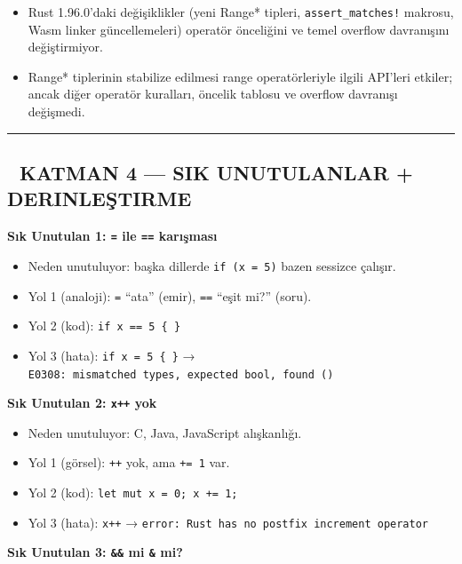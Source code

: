 \documentclass[12pt,a4paper]{article}
\begin{document}
\begin{itemize}
\tightlist
\item
  Rust 1.96.0'daki değişiklikler (yeni Range* tipleri, \texttt{assert\_matches!} makrosu, Wasm linker güncellemeleri) operatör önceliğini ve temel overflow davranışını değiştirmiyor.
\item
  Range* tiplerinin stabilize edilmesi range operatörleriyle ilgili API'leri etkiler; ancak diğer operatör kuralları, öncelik tablosu ve overflow davranışı değişmedi.
\end{itemize}

\begin{center}\rule{0.5\linewidth}{0.5pt}\end{center}

\subsection{🔴 KATMAN 4 --- SIK UNUTULANLAR + DERINLEŞTIRME}\label{katman-4-—-sik-unutulanlar-derinleştirme-4}

\textbf{Sık Unutulan 1: \texttt{=} ile \texttt{==} karışması}

\begin{itemize}
\tightlist
\item
  Neden unutuluyor: başka dillerde \texttt{if\ (x\ =\ 5)} bazen sessizce çalışır.
\item
  Yol 1 (analoji): \texttt{=} ``ata'' (emir), \texttt{==} ``eşit mi?'' (soru).
\item
  Yol 2 (kod): \texttt{if\ x\ ==\ 5\ \{\ \}}
\item
  Yol 3 (hata): \texttt{if\ x\ =\ 5\ \{\ \}} → \texttt{E0308:\ mismatched\ types,\ expected\ bool,\ found\ ()}
\end{itemize}

\textbf{Sık Unutulan 2: \texttt{x++} yok}

\begin{itemize}
\tightlist
\item
  Neden unutuluyor: C, Java, JavaScript alışkanlığı.
\item
  Yol 1 (görsel): \texttt{++} yok, ama \texttt{+=\ 1} var.
\item
  Yol 2 (kod): \texttt{let\ mut\ x\ =\ 0;\ x\ +=\ 1;}
\item
  Yol 3 (hata): \texttt{x++} → \texttt{error:\ Rust\ has\ no\ postfix\ increment\ operator}
\end{itemize}

\textbf{Sık Unutulan 3: \texttt{\&\&} mi \texttt{\&} mi?}
\end{document}
